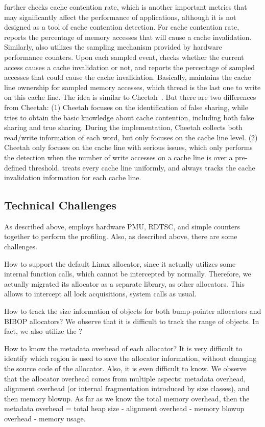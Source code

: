 \MP{} further checks cache contention rate, which is another important metrics that may significantly affect the performance of applications, although it is not designed as a tool of cache contention detection. For cache contention rate, \MP{} reports the percentage of memory accesses that will cause a cache invalidation.  Similarly, \MP{} also utilizes the sampling mechanism provided by hardware performance counters. Upon each sampled event, \MP{} checks whether the current access causes a cache invalidation or not, and reports the percentage of sampled accesses that could cause the cache invalidation. Basically, \MP{} maintains the cache line ownership for sampled memory accesses, which thread is the last one to write on this cache line. The idea is similar to Cheetah~\cite{Cheetah}. But there are two differences from Cheetah: (1) Cheetah focuses on the identification of false sharing, while \MP{} tries to obtain the basic knowledge about cache contention, including both false sharing and true sharing. During the implementation, Cheetah collects both read/write information of each word, but \MP{} only focuses on the cache line level. (2)  Cheetah only focuses on the cache line with serious issues, which only performs the detection when the number of write accesses on a cache line is over a pre-defined threshold. \MP{} treats every cache line uniformly, and always tracks the cache invalidation information for each cache line. 

\subsection{Technical Challenges}

As described above, \MP{} employs hardware PMU, RDTSC, and simple counters together to perform the profiling. Also, as described above, there are some challenges. 
 

How to support the default Linux allocator, since it actually utilizes some internal function calls, which cannot be intercepted by \MP{} normally. Therefore, we actually migrated its allocator as a separate library, as other allocators. This allows \MP{} to intercept all lock acquisitions, system calls as usual. 

How to track the size information of objects for both bump-pointer allocators and BIBOP allocators? We observe that it is difficult to track the range of objects. In fact, we also utilize the ?

How to know the metadata overhead of each allocator? It is very difficult to identify which region is used to save the allocator information, without changing the source code of the allocator. Also, it is even difficult to know. We observe that the allocator overhead comes from multiple aspects: metadata overhead, alignment overhead (or internal fragmentation introduced by size classes), and then memory blowup. 
As far as we know the total memory overhead, then the metadata overhead = total heap size - alignment overhead - memory blowup overhead - memory usage.

